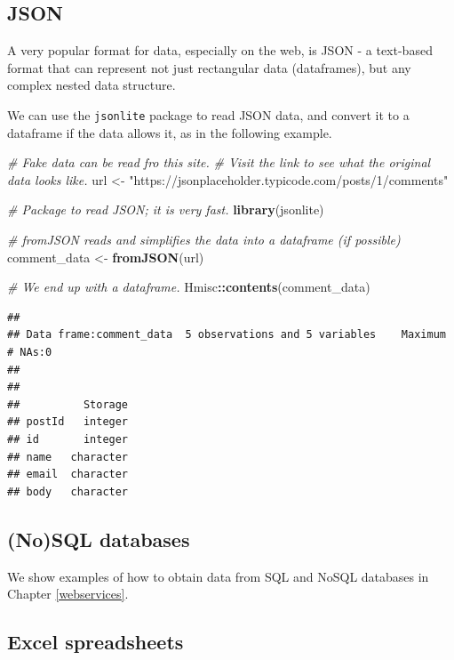 \documentclass[]{book}
\newenvironment{Shaded}{\begin{snugshade}}{\end{snugshade}}
\newcommand{\CommentTok}[1]{\textcolor[rgb]{0.56,0.35,0.01}{\textit{#1}}}
\newcommand{\KeywordTok}[1]{\textcolor[rgb]{0.13,0.29,0.53}{\textbf{#1}}}
\newcommand{\NormalTok}[1]{#1}
\newcommand{\OperatorTok}[1]{\textcolor[rgb]{0.81,0.36,0.00}{\textbf{#1}}}
\newcommand{\StringTok}[1]{\textcolor[rgb]{0.31,0.60,0.02}{#1}}
\begin{document}
\hypertarget{json}{%
\subsection{JSON}\label{json}}

A very popular format for data, especially on the web, is JSON - a text-based format that can represent not just rectangular data (dataframes), but any complex nested data structure.

We can use the \texttt{jsonlite} package to read JSON data, and convert it to a dataframe if the data allows it, as in the following example.

\begin{Shaded}
\begin{Highlighting}[]
\CommentTok{# Fake data can be read fro this site.}
\CommentTok{# Visit the link to see what the original data looks like.}
\NormalTok{url <-}\StringTok{ "https://jsonplaceholder.typicode.com/posts/1/comments"}

\CommentTok{# Package to read JSON; it is very fast.}
\KeywordTok{library}\NormalTok{(jsonlite)}

\CommentTok{# fromJSON reads and simplifies the data into a dataframe (if possible)}
\NormalTok{comment_data <-}\StringTok{ }\KeywordTok{fromJSON}\NormalTok{(url)}

\CommentTok{# We end up with a dataframe.}
\NormalTok{Hmisc}\OperatorTok{::}\KeywordTok{contents}\NormalTok{(comment_data)}
\end{Highlighting}
\end{Shaded}

\begin{verbatim}
## 
## Data frame:comment_data  5 observations and 5 variables    Maximum # NAs:0
## 
## 
##          Storage
## postId   integer
## id       integer
## name   character
## email  character
## body   character
\end{verbatim}

\hypertarget{nosql-databases}{%
\subsection{(No)SQL databases}\label{nosql-databases}}

We show examples of how to obtain data from SQL and NoSQL databases in Chapter \ref{webservices}.

\hypertarget{excel-spreadsheets}{%
\subsection{Excel spreadsheets}\label{excel-spreadsheets}}
\end{document}

